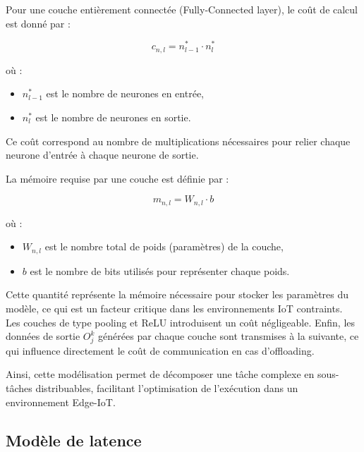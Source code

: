 \documentclass[12pt,a4paper]{report}
\begin{document}
\vspace{0.3cm}

Pour une couche entièrement connectée (Fully-Connected layer), le coût de calcul est donné par :

\begin{equation}
c_{n,l} = n_{l-1}^* \cdot n_l^*
\end{equation}

où :
\begin{itemize}
    \item $n_{l-1}^*$ est le nombre de neurones en entrée,
    \item $n_l^*$ est le nombre de neurones en sortie.
\end{itemize}

Ce coût correspond au nombre de multiplications nécessaires pour relier chaque neurone d’entrée à chaque neurone de sortie.

\vspace{0.3cm}

La mémoire requise par une couche est définie par :

\begin{equation}
m_{n,l} = W_{n,l} \cdot b
\end{equation}

où :
\begin{itemize}
    \item $W_{n,l}$ est le nombre total de poids (paramètres) de la couche,
    \item $b$ est le nombre de bits utilisés pour représenter chaque poids.
\end{itemize}

Cette quantité représente la mémoire nécessaire pour stocker les paramètres du modèle, ce qui est un facteur critique dans les environnements IoT contraints.\\

Les couches de type pooling et ReLU introduisent un coût négligeable. Enfin, les données de sortie $O_j^k$ générées par chaque couche sont transmises à la suivante, ce qui influence directement le coût de communication en cas d’offloading.

Ainsi, cette modélisation permet de décomposer une tâche complexe en sous-tâches distribuables, facilitant l’optimisation de l’exécution dans un environnement Edge-IoT.

\subsection{Modèle de latence}
\end{document}
